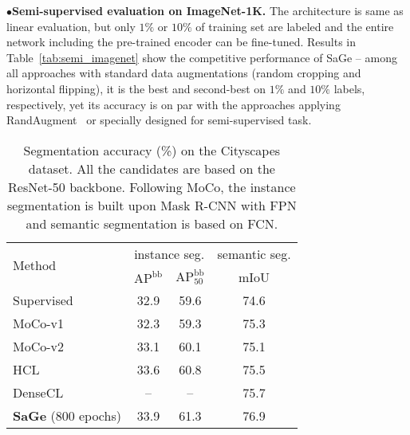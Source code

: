 \documentclass[10pt,twocolumn,letterpaper]{article}
\begin{document}
\vspace{0.1cm}\noindent
$\bullet$\hspace{0.2cm}\textbf{Semi-supervised evaluation on ImageNet-1K.} The architecture is same as linear evaluation, but only $1\%$ or $10\%$ of training set are labeled and the entire network including the pre-trained encoder can be fine-tuned. Results in Table~\ref{tab:semi_imagenet} show the competitive performance of SaGe -- among all approaches with standard data augmentations (random cropping and horizontal flipping), it is the best and second-best on $1\%$ and $10\%$ labels, respectively, yet its accuracy is on par with the approaches applying RandAugment~\cite{RandAugmentation} or specially designed for semi-supervised task.

\begin{table}[!t]
\centering
\fontsize{9.5}{11.0}\selectfont
\setlength{\tabcolsep}{2.0mm}
\begin{tabular}{l|cc|c}
\toprule
\multirow{2}{*}{Method} &\multicolumn{2}{c|}{instance seg.} & semantic seg. \\ 
                         & $\mathrm{AP}^{\mathrm{bb}}$ &$\mathrm{AP}_{50}^{\mathrm{bb}}$
                         & mIoU\\ \midrule
Supervised &       32.9     &      59.6  & 74.6    \\ \midrule
MoCo-v1~\cite{he2020momentum} &   32.3    &    59.3  & 75.3               \\
MoCo-v2~\cite{chen2020improved} &   33.1   &     60.1     & 75.1             \\
HCL~\cite{HCL} & 33.6          &   60.8  &  75.5                \\ 
DenseCL~\cite{wang2021dense} & --          &  --  &  75.7                \\ \midrule
\textbf{SaGe} (800 epochs)  &   33.9   &     61.3    & 76.9            \\ 
\bottomrule
\end{tabular}
\caption{Segmentation accuracy (\%) on the Cityscapes dataset. All the candidates are based on the ResNet-50 backbone. Following MoCo, the instance segmentation is built upon Mask R-CNN with FPN and semantic segmentation is based on FCN.}
\label{tab:cityscapes}
\end{table}
\end{document}
